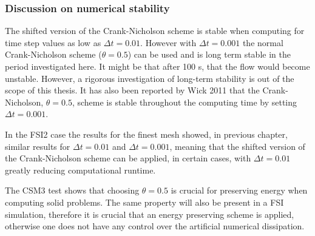 \subsubsection*{Discussion on numerical stability}
The shifted version of the Crank-Nicholson scheme is stable when computing for time step values as low as $\Delta t = 0.01$. However with $\Delta t = 0.001$ the normal Crank-Nicholson scheme ($\theta =0.5$) can be used and is long term stable in the period investigated here. It might be that after 100 s, that the flow would become unstable. However, a rigorous investigation of long-term stability is out of the scope of this thesis. 
It has also been reported by Wick 2011 \cite{Wick2011} that the Crank-Nicholson, $\theta = 0.5$, scheme is stable throughout the computing time by setting $\Delta t = 0.001$.

In the FSI2 case the results for the finest mesh showed, in previous chapter, similar results for $\Delta t = 0.01$ and $\Delta t = 0.001$, meaning that the shifted version of the Crank-Nicholson scheme can be applied, in certain cases, with $\Delta t = 0.01$ greatly reducing computational runtime.

The CSM3 test shows that choosing $\theta = 0.5$ is crucial for preserving energy when computing solid problems. The same property will also be present in a FSI simulation, therefore it is crucial that an energy preserving scheme is applied, otherwise one does not have any control over the artificial numerical dissipation.




